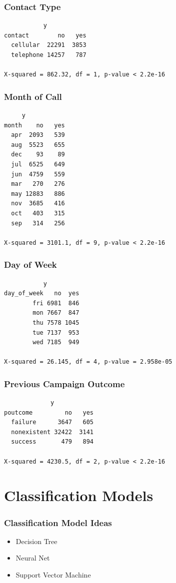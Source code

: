 \documentclass{beamer}
\begin{document}
\begin{frame}[fragile]
  \frametitle{Contact Type}
  \begin{verbatim}
           y
contact        no   yes
  cellular  22291  3853
  telephone 14257   787

X-squared = 862.32, df = 1, p-value < 2.2e-16
  \end{verbatim}
\end{frame}

\begin{frame}[fragile]
  \frametitle{Month of Call}
  \begin{verbatim}
     y
month    no   yes
  apr  2093   539
  aug  5523   655
  dec    93    89
  jul  6525   649
  jun  4759   559
  mar   270   276
  may 12883   886
  nov  3685   416
  oct   403   315
  sep   314   256

X-squared = 3101.1, df = 9, p-value < 2.2e-16
  \end{verbatim}
\end{frame}

\begin{frame}[fragile]
  \frametitle{Day of Week}
  \begin{verbatim}
           y
day_of_week   no  yes
        fri 6981  846
        mon 7667  847
        thu 7578 1045
        tue 7137  953
        wed 7185  949

X-squared = 26.145, df = 4, p-value = 2.958e-05
  \end{verbatim}
\end{frame}

\begin{frame}[fragile]
  \frametitle{Previous Campaign Outcome}
  \begin{verbatim}
             y
poutcome         no   yes
  failure      3647   605
  nonexistent 32422  3141
  success       479   894

X-squared = 4230.5, df = 2, p-value < 2.2e-16
  \end{verbatim}
\end{frame}

\section{Classification Models}

\begin{frame}
  \frametitle{Classification Model Ideas}
  \begin{itemize}
    \item Decision Tree
      \newline
    \item Neural Net
      \newline
    \item Support Vector Machine
      \newline
  \end{itemize}
\end{frame}
\end{document}
